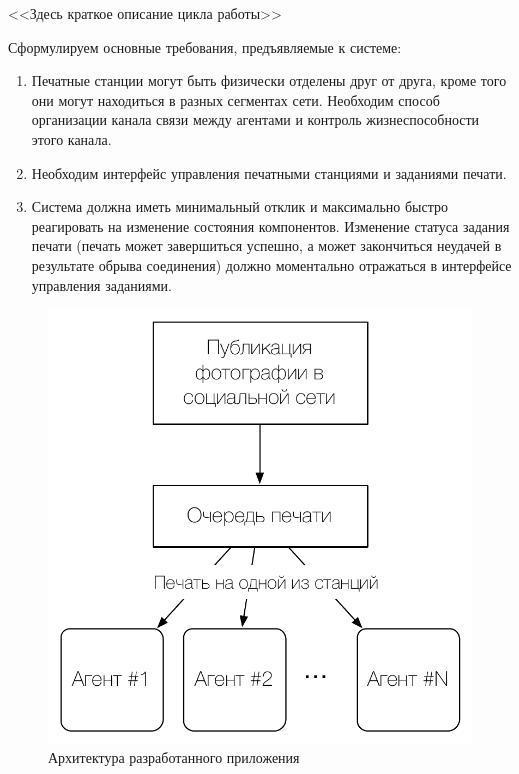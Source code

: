 \documentclass[a4paper,14pt,href]{article}
\begin{document}
<<Здесь краткое описание цикла работы>>

Сформулируем основные требования, предъявляемые к системе:
\begin{enumerate}
  \item Печатные станции могут быть физически отделены друг от друга, кроме того они могут находиться в разных сегментах сети. Необходим способ
    организации канала связи между агентами и контроль жизнеспособности этого канала.

  \item Необходим интерфейс управления печатными станциями и заданиями печати.

  \item Система должна иметь минимальный отклик и максимально быстро реагировать на изменение состояния компонентов. Изменение статуса задания печати (печать может завершиться успешно, а может закончиться неудачей в результате обрыва соединения) должно моментально отражаться в интерфейсе управления заданиями.


\end{enumerate}

\begin{figure}[htbp]
\begin{center}
  \includegraphics[scale=0.7]{print_schema.pdf}
    \caption{Архитектура разработанного приложения}
    \label{fig:Architecture}
\end{center}
\end{figure}



\newpage
{}



\end{document}
